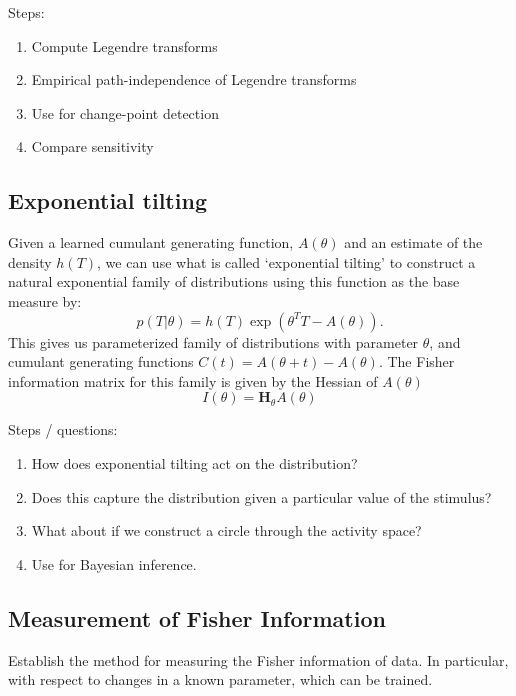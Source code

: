 \documentclass[10pt, twocolumn]{article}      %
\begin{document}
Steps:
\begin{enumerate}
  \item Compute Legendre transforms
  \item Empirical path-independence of Legendre transforms
  \item Use for change-point detection
  \item Compare sensitivity
\end{enumerate}



\subsection{Exponential tilting}
Given a learned cumulant generating function, $A(\theta)$ and an estimate of the density $h(T)$, we can use what is called `exponential tilting' \cite{morris_natural_1982,morris_unifying_2009} to construct a natural exponential family of distributions using this function as the base measure by:
\begin{equation}
  p(T | \theta) = h(T) \exp( \theta^T T - A(\theta)).
\end{equation}
This gives us parameterized family of distributions with parameter $\theta$, and cumulant generating functions $C(t) = A(\theta +t) - A(\theta)$.
The Fisher information matrix for this family is given by the Hessian of $A(\theta)$ 
\begin{equation}
  I(\theta) = \bm{H}_\theta A(\theta) 
\end{equation}

Steps / questions:
\begin{enumerate}
  \item How does exponential tilting act on the distribution?
  \item Does this capture the distribution given a particular value of the stimulus?
  \item What about if we construct a circle through the activity space?
  \item Use for Bayesian inference.
\end{enumerate}



\subsection{Measurement of Fisher Information}

Establish the method for measuring the Fisher information of data. In particular, with respect to changes in a known parameter, which can be trained.
\end{document}
